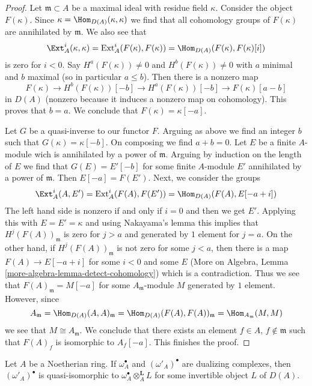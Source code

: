 \begin{proof}
Let $\mathfrak m \subset A$ be a maximal ideal with residue field $\kappa$.
Consider the object $F(\kappa)$. Since
$\kappa = \Hom_{D(A)}(\kappa, \kappa)$ we find that all
cohomology groups of $F(\kappa)$ are annihilated by $\mathfrak m$.
We also see that
$$
\Ext^i_A(\kappa, \kappa) = \text{Ext}^i_A(F(\kappa), F(\kappa))
= \Hom_{D(A)}(F(\kappa), F(\kappa)[i])
$$
is zero for $i < 0$. Say $H^a(F(\kappa)) \not = 0$ and
$H^b(F(\kappa)) \not = 0$ with $a$ minimal and $b$ maximal
(so in particular $a \leq b$). Then there is a nonzero map
$$
F(\kappa) \to H^b(F(\kappa))[-b] \to H^a(F(\kappa))[-b]
\to F(\kappa)[a - b]
$$
in $D(A)$ (nonzero because it induces a nonzero map on cohomology).
This proves that $b = a$. We conclude that $F(\kappa) = \kappa[-a]$.

\medskip\noindent
Let $G$ be a quasi-inverse to our functor $F$. Arguing as above
we find an integer $b$ such that $G(\kappa) = \kappa[-b]$.
On composing we find $a + b = 0$. Let $E$ be a finite $A$-module
wich is annihilated by a power of $\mathfrak m$. Arguing by
induction on the length of $E$ we find that $G(E) = E'[-b]$
for some finite $A$-module $E'$ annihilated by a power of
$\mathfrak m$. Then $E[-a] = F(E')$.
Next, we consider the groups
$$
\Ext^i_A(A, E') = \text{Ext}^i_A(F(A), F(E')) =
\Hom_{D(A)}(F(A), E[-a + i])
$$
The left hand side is nonzero if and only if $i = 0$ and then
we get $E'$. Applying this with $E = E' = \kappa$ and using Nakayama's
lemma this implies that $H^j(F(A))_\mathfrak m$ is zero for $j > a$ and
generated by $1$ element for $j = a$. On the other hand, if
$H^j(F(A))_\mathfrak m$ is not zero for some $j < a$, then
there is a map $F(A) \to E[-a + i]$ for some $i < 0$ and some
$E$ (More on Algebra, Lemma \ref{more-algebra-lemma-detect-cohomology})
which is a contradiction.
Thus we see that $F(A)_\mathfrak m = M[-a]$
for some $A_\mathfrak m$-module $M$ generated by $1$ element.
However, since
$$
A_\mathfrak m = \Hom_{D(A)}(A, A)_\mathfrak m =
\Hom_{D(A)}(F(A), F(A))_\mathfrak m = \Hom_{A_\mathfrak m}(M, M)
$$
we see that $M \cong A_\mathfrak m$. We conclude that there exists
an element $f \in A$, $f \not \in \mathfrak m$ such that
$F(A)_f$ is isomorphic to $A_f[-a]$. This finishes the proof.
\end{proof}

\begin{lemma}
\label{lemma-dualizing-unique}
Let $A$ be a Noetherian ring. If $\omega_A^\bullet$ and
$(\omega'_A)^\bullet$ are dualizing complexes, then
$(\omega'_A)^\bullet$ is quasi-isomorphic to
$\omega_A^\bullet \otimes_A^\mathbf{L} L$
for some invertible object $L$ of $D(A)$.
\end{lemma}

